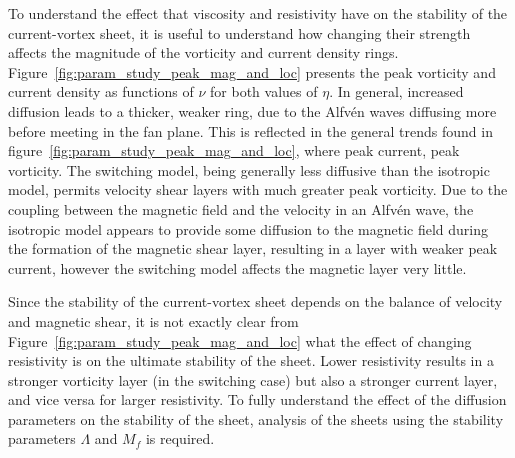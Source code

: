 To understand the effect that viscosity and resistivity have on the stability of the current-vortex sheet, it is useful to understand how changing their strength affects the magnitude of the vorticity and current density rings. Figure~\ref{fig:param_study_peak_mag_and_loc} presents the peak vorticity and current density as functions of $\nu$ for both values of $\eta$. In general, increased diffusion leads to a thicker, weaker ring, due to the Alfv\'en waves diffusing more before meeting in the fan plane. This is reflected in the general trends found in figure~\ref{fig:param_study_peak_mag_and_loc}, where peak current, peak vorticity. The switching model, being generally less diffusive than the isotropic model, permits velocity shear layers with much greater peak vorticity. Due to the coupling between the magnetic field and the velocity in an Alfv\'en wave, the isotropic model appears to provide some diffusion to the magnetic field during the formation of the magnetic shear layer, resulting in a layer with weaker peak current, however the switching model affects the magnetic layer very little.

Since the stability of the current-vortex sheet depends on the balance of velocity and magnetic shear, it is not exactly clear from Figure~\ref{fig:param_study_peak_mag_and_loc} what the effect of changing resistivity is on the ultimate stability of the sheet. Lower resistivity results in a stronger vorticity layer (in the switching case) but also a stronger current layer, and vice versa for larger resistivity. To fully understand the effect of the diffusion parameters on the stability of the sheet, analysis of the sheets using the stability parameters $\Lambda$ and $M_f$ is required.


